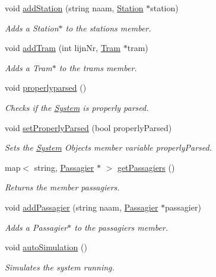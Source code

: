 \begin{DoxyCompactItemize}
void \hyperlink{classSystem_a8d73a59e5ca0c23cc36d3bf4b7ac902d}{add\+Station} (string naam, \hyperlink{classStation}{Station} $\ast$station)
\begin{DoxyCompactList}\small\item\em Adds a Station$\ast$ to the stations member. \end{DoxyCompactList}\item 
void \hyperlink{classSystem_a9c6d16ae38e21499491a7059d67f9284}{add\+Tram} (int lijn\+Nr, \hyperlink{classTram}{Tram} $\ast$tram)
\begin{DoxyCompactList}\small\item\em Adds a Tram$\ast$ to the trams member. \end{DoxyCompactList}\item 
void \hyperlink{classSystem_a8060d45e6030ee1ad01a11a990bdd1ad}{properlyparsed} ()\hypertarget{classSystem_a8060d45e6030ee1ad01a11a990bdd1ad}{}\label{classSystem_a8060d45e6030ee1ad01a11a990bdd1ad}

\begin{DoxyCompactList}\small\item\em Checks if the \hyperlink{classSystem}{System} is properly parsed. \end{DoxyCompactList}\item 
void \hyperlink{classSystem_af140010428a79ddde06f3546e7737d86}{set\+Properly\+Parsed} (bool properly\+Parsed)
\begin{DoxyCompactList}\small\item\em Sets the \hyperlink{classSystem}{System} Object\textquotesingle{}s member variable properly\+Parsed. \end{DoxyCompactList}\item 
map$<$ string, \hyperlink{classPassagier}{Passagier} $\ast$ $>$ \hyperlink{classSystem_a25bf1c319312604ce89890fa827f4552}{get\+Passagiers} ()
\begin{DoxyCompactList}\small\item\em Returns the member passagiers. \end{DoxyCompactList}\item 
void \hyperlink{classSystem_ad2a3016a3d4cf9273cf8156f4fc69dfb}{add\+Passagier} (string naam, \hyperlink{classPassagier}{Passagier} $\ast$passagier)
\begin{DoxyCompactList}\small\item\em Adds a Passagier$\ast$ to the passagiers member. \end{DoxyCompactList}\item 
void \hyperlink{classSystem_ae392bbed93678914f3b0aff18c4a6d4d}{auto\+Simulation} ()
\begin{DoxyCompactList}\small\item\em Simulates the system running. \end{DoxyCompactList}\end{DoxyCompactItemize}


